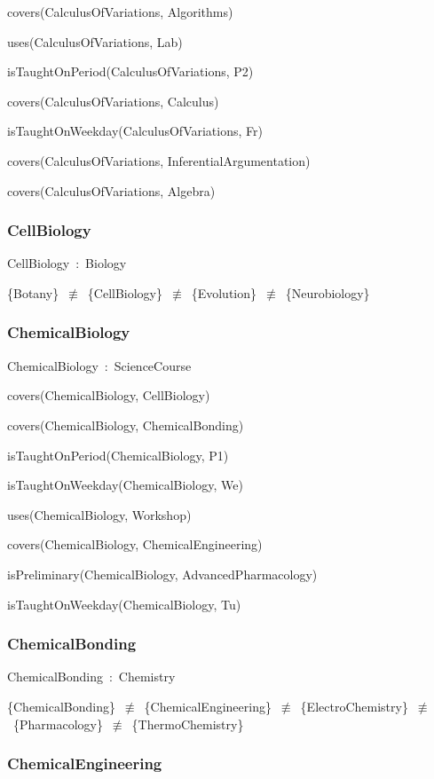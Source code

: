 \documentclass{article}
\begin{document}
covers(CalculusOfVariations, Algorithms)

uses(CalculusOfVariations, Lab)

isTaughtOnPeriod(CalculusOfVariations, P2)

covers(CalculusOfVariations, Calculus)

isTaughtOnWeekday(CalculusOfVariations, Fr)

covers(CalculusOfVariations, InferentialArgumentation)

covers(CalculusOfVariations, Algebra)

\subsubsection*{CellBiology}

CellBiology~:~Biology

\{Botany\}~\ensuremath{\not\equiv}~\{CellBiology\}~\ensuremath{\not\equiv}~\{Evolution\}~\ensuremath{\not\equiv}~\{Neurobiology\}

\subsubsection*{ChemicalBiology}

ChemicalBiology~:~ScienceCourse

covers(ChemicalBiology, CellBiology)

covers(ChemicalBiology, ChemicalBonding)

isTaughtOnPeriod(ChemicalBiology, P1)

isTaughtOnWeekday(ChemicalBiology, We)

uses(ChemicalBiology, Workshop)

covers(ChemicalBiology, ChemicalEngineering)

isPreliminary(ChemicalBiology, AdvancedPharmacology)

isTaughtOnWeekday(ChemicalBiology, Tu)

\subsubsection*{ChemicalBonding}

ChemicalBonding~:~Chemistry

\{ChemicalBonding\}~\ensuremath{\not\equiv}~\{ChemicalEngineering\}~\ensuremath{\not\equiv}~\{ElectroChemistry\}~\ensuremath{\not\equiv}~\{Pharmacology\}~\ensuremath{\not\equiv}~\{ThermoChemistry\}

\subsubsection*{ChemicalEngineering}
\end{document}
